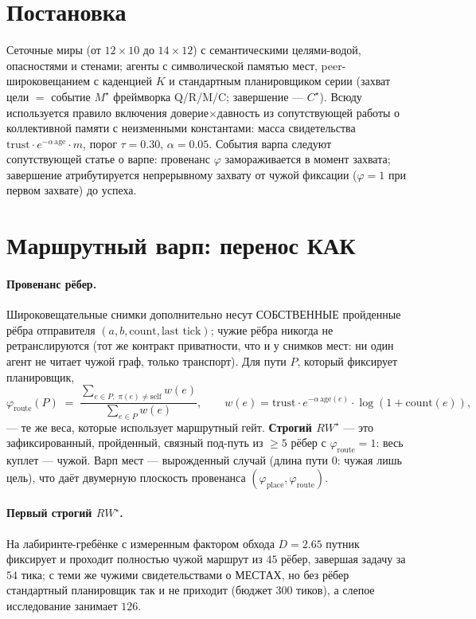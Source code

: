 \documentclass{article}
\newcommand{\rwstar}{RW^{\star}}
\newcommand{\mstar}{M^{\star}}
\newcommand{\cstar}{C^{\star}}
\newcommand{\phiroute}{\varphi_{\mathrm{route}}}
\begin{document}
\section{Постановка}
\label{sec:setting}

Сеточные миры (от $12{\times}10$ до $14{\times}12$) с семантическими
целями-водой, опасностями и стенами; агенты с символической памятью
мест, peer-широковещанием с каденцией $K$ и стандартным планировщиком
серии (захват цели $=$ событие $\mstar$ фреймворка Q/R/M/C; завершение
--- $\cstar$). Всюду используется правило включения
доверие$\times$давность из сопутствующей работы о коллективной памяти
с неизменными константами: масса свидетельства
$\text{trust}\cdot e^{-\alpha\,\text{age}}\cdot m$, порог
$\tau{=}0.30$, $\alpha{=}0.05$. События варпа следуют сопутствующей
статье о варпе: провенанс $\varphi$ замораживается в момент захвата;
завершение атрибутируется непрерывному захвату от чужой фиксации
($\varphi{=}1$ при первом захвате) до успеха.

\section{Маршрутный варп: перенос КАК}
\label{sec:route}

\paragraph{Провенанс рёбер.} Широковещательные снимки дополнительно
несут СОБСТВЕННЫЕ пройденные рёбра отправителя
$(a,b,\text{count},\text{last tick})$; чужие рёбра никогда не
ретранслируются (тот же контракт приватности, что и у снимков мест: ни
один агент не читает чужой граф, только транспорт). Для пути $P$,
который фиксирует планировщик,
\[
\phiroute(P) \;=\;
\frac{\sum_{e\in P,\;\pi(e)\neq\mathrm{self}} w(e)}
     {\sum_{e\in P} w(e)},
\qquad w(e) = \text{trust}\cdot e^{-\alpha\,\text{age}(e)}\cdot
\log(1{+}\text{count}(e)),
\]
--- те же веса, которые использует маршрутный гейт. \textbf{Строгий
$\rwstar$} --- это зафиксированный, пройденный, связный под-путь из
$\ge 5$ рёбер с $\phiroute = 1$: весь куплет --- чужой. Варп мест ---
вырожденный случай (длина пути $0$: чужая лишь цель), что даёт
двумерную плоскость провенанса $(\varphi_{\mathrm{place}},
\phiroute)$.

\paragraph{Первый строгий $\rwstar$.} На лабиринте-гребёнке с
измеренным фактором обхода $D{=}2.65$ путник фиксирует и проходит
полностью чужой маршрут из $45$ рёбер, завершая задачу за $54$ тика; с
теми же чужими свидетельствами о МЕСТАХ, но без рёбер стандартный
планировщик так и не приходит (бюджет $300$ тиков), а слепое
исследование занимает $126$.
\end{document}
